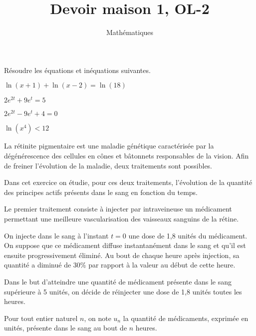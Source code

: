 \documentclass[a4paper,12pt]{scrartcl}
\date{}
\title{Devoir maison 1, OL-2}
\author{Mathématiques}
\begin{document}
\maketitle


Résoudre les équations et inéquations suivantes.

\begin{multicols}{2}

\question{}
$\ln(x+1) + \ln(x-2) = \ln(18)$

\question{}
$2e^{2t} + 9e^t = 5$

\question{}
$2e^{2t} - 9e^t + 4 = 0$

\question{}
$\ln(x^4) < 12$

\end{multicols}


La rétinite pigmentaire est une maladie génétique caractérisée par la dégénérescence des cellules en cônes et bâtonnets responsables de la vision. Afin de freiner l'évolution de la maladie, deux traitements sont possibles.

Dans cet exercice on étudie, pour ces deux traitements, l'évolution de la quantité des principes actifs présents dans le sang en fonction du temps. 


Le premier traitement consiste à injecter par intraveineuse un médicament permettant une meilleure vascularisation des vaisseaux sanguins de la rétine.

On injecte dans le sang à l'instant $t = 0$ une dose de 1,8 unités du médicament. On suppose que ce médicament diffuse instantanément dans le sang et qu'il est ensuite progressivement éliminé. Au bout de chaque heure après injection, sa quantité a diminué de 30\% par rapport à la valeur au début de cette heure.

Dans le but d'atteindre une quantité de médicament présente dans le sang supérieure à 5 unités, on décide de réinjecter une dose de 1,8 unités toutes les heures.

Pour tout entier naturel $n$, on note $u_n$ la quantité de médicaments, exprimée en unités, présente dans le sang au bout de $n$ heures.
 

\end{document}
